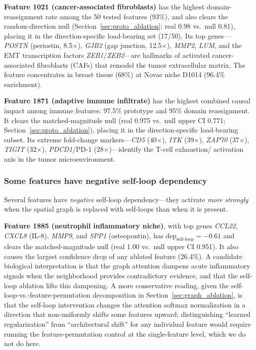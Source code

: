 \documentclass[11pt]{article}
\begin{document}
\textbf{Feature 1021 (cancer-associated fibroblasts)} has the highest
domain-reassignment rate among the 50 tested features (93\%), and
also clears the random-direction null
(Section~\ref{sec:proto_ablation}: real 0.98 vs.\ null 0.81),
placing it in the direction-specific load-bearing set (17/50). Its
top genes---\emph{POSTN} (periostin, 8.5$\times$), \emph{GJB2} (gap
junction, 12.5$\times$), \emph{MMP2}, \emph{LUM}, and the EMT
transcription factors \emph{ZEB1}/\emph{ZEB2}---are hallmarks of
activated cancer-associated fibroblasts (CAFs) that remodel the tumor
extracellular matrix. The feature concentrates in breast tissue
(68\%) at Novae niche D1014 (96.4\% enrichment).

\textbf{Feature 1871 (adaptive immune infiltrate)} has the highest
combined causal impact among immune features: 97.5\% prototype and
95\% domain reassignment. It clears the matched-magnitude null
(real 0.975 vs.\ null upper CI 0.771;
Section~\ref{sec:proto_ablation}), placing it in the
direction-specific load-bearing subset. Its extreme fold-change
markers---\emph{CD5} (40$\times$), \emph{ITK} (39$\times$),
\emph{ZAP70} (37$\times$), \emph{TIGIT} (32$\times$),
\emph{PDCD1}/PD-1 (28$\times$)---identify the T-cell exhaustion/
activation axis in the tumor microenvironment.

\subsubsection{Some features have negative self-loop dependency}

Several features have \emph{negative} self-loop dependency---they
activate \emph{more strongly} when the spatial graph is replaced with
self-loops than when it is present.

\textbf{Feature 1885 (neutrophil inflammatory niche)}, with top genes
\emph{CCL22}, \emph{CXCL8} (IL-8), \emph{MMP9}, and \emph{SPP1}
(osteopontin), has $\text{dep}_\text{self-loop} = -0.61$ and clears
the matched-magnitude null (real 1.00 vs.\ null upper CI 0.951). It
also causes the largest confidence drop of any ablated feature
(26.4\%). A candidate biological interpretation is that the graph
attention dampens acute inflammatory signals when the neighborhood
provides contradictory evidence, and that the self-loop ablation
lifts this dampening. A more conservative reading, given the self-
loop-vs.-feature-permutation decomposition in
Section~\ref{sec:graph_ablation}, is that the self-loop intervention
changes the attention softmax normalization in a direction that
non-uniformly shifts some features upward; distinguishing ``learned
regularization'' from ``architectural shift'' for any individual
feature would require running the feature-permutation control at the
single-feature level, which we do not do here.
\end{document}
